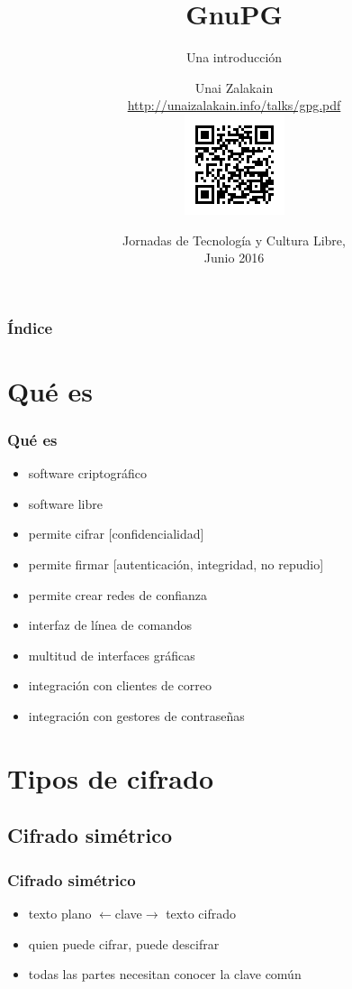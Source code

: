 \documentclass{beamer}
\title{GnuPG}
\subtitle{Una introducción}
\author{Unai Zalakain\\
{\tiny \url{http://unaizalakain.info/talks/gpg.pdf}}\\
\includegraphics[height=.2\textheight]{qrlink}
}
\date{Jornadas de Tecnología y Cultura Libre,\\ Junio 2016}
\let\olditem\item
\renewcommand{\item}{%
\olditem\vspace{3pt}}
\begin{document}
\frame{\titlepage}

\begin{frame}
\frametitle{Índice}
\tableofcontents
\end{frame}


\section{Qué es}
\begin{frame}
\frametitle{Qué es}
\begin{itemize}
    \item software criptográfico
    \item software libre
    \item permite cifrar [confidencialidad]
    \item permite firmar [autenticación, integridad, no repudio]
    \item permite crear redes de confianza
    \item interfaz de línea de comandos
    \item multitud de interfaces gráficas
    \item integración con clientes de correo
    \item integración con gestores de contraseñas
\end{itemize}
\end{frame}


\section{Tipos de cifrado}
\subsection{Cifrado simétrico}
\begin{frame}
\frametitle{Cifrado simétrico}
\begin{itemize}
    \item texto plano {\tiny $\leftarrow$clave$\rightarrow$} texto cifrado
    \item quien puede cifrar, puede descifrar
    \item todas las partes necesitan conocer la clave común
\end{itemize}
\end{frame}
\end{document}
